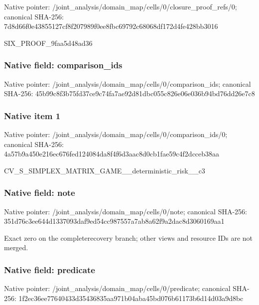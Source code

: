 \documentclass[10pt,a4paper]{article}
\begin{document}
Native pointer: /joint\_analysis/domain\_m\allowbreak{}ap/cells/0/closure\_proof\allowbreak{}\_refs/0; canonical SHA-256: 7d8d66f0e43855127cf8f207\allowbreak{}989f0ee8fbc69792c68068df\allowbreak{}172d4fe428bb3016


SIX\_PROOF\_9faa5d48ad36


\subsubsection{Native field: comparison\_ids}


Native pointer: /joint\_analysis/domain\_m\allowbreak{}ap/cells/0/comparison\_id\allowbreak{}s; canonical SHA-256: 45b99c8f3b75fd37ce9c74fa\allowbreak{}7ae92d81dbc055c826e06e03\allowbreak{}6b94bd76dd26e7c8



\subsubsection{Native item 1}


Native pointer: /joint\_analysis/domain\_m\allowbreak{}ap/cells/0/comparison\_id\allowbreak{}s/0; canonical SHA-256: 4a57b9a450e216ec676fed12\allowbreak{}4084da8f4f6d3aac8d0cb1fa\allowbreak{}e59c4f2dcceb38aa


CV\_S\_SIMPLEX\_MATRIX\_GAME\allowbreak{}\_\_deterministic\_risk\_\_c3


\subsubsection{Native field: note}


Native pointer: /joint\_analysis/domain\_map/cells/0/note; canonical SHA-256: 351d76c3ee644d1337093daf\allowbreak{}9ed54cc987557a7ab8a62f9a\allowbreak{}2dac8d3060169aa1


Exact zero on the completerecovery branch; other views and resource IDs are not merged.


\subsubsection{Native field: predicate}


Native pointer: /joint\_analysis/domain\_m\allowbreak{}ap/cells/0/predicate; canonical SHA-256: 1f2ec36ee77640433d354368\allowbreak{}35aa971b04aba45bd076b611\allowbreak{}73b6d14d03a9d8bc
\end{document}
